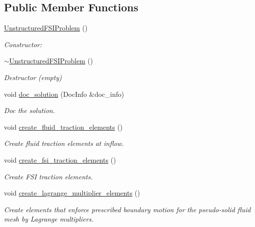 \subsection*{Public Member Functions}
\begin{DoxyCompactItemize}
\item 
\hyperlink{classUnstructuredFSIProblem_a6a31fd839e0215ef1312942cf7284bd2}{Unstructured\+F\+S\+I\+Problem} ()
\begin{DoxyCompactList}\small\item\em Constructor\+: \end{DoxyCompactList}\item 
\hyperlink{classUnstructuredFSIProblem_a976a81e0dee902f6713bd8ca4d79d000}{$\sim$\+Unstructured\+F\+S\+I\+Problem} ()
\begin{DoxyCompactList}\small\item\em Destructor (empty) \end{DoxyCompactList}\item 
void \hyperlink{classUnstructuredFSIProblem_a15f581318b505de07f50bd570da8c8d0}{doc\+\_\+solution} (Doc\+Info \&doc\+\_\+info)
\begin{DoxyCompactList}\small\item\em Doc the solution. \end{DoxyCompactList}\item 
void \hyperlink{classUnstructuredFSIProblem_af766e3bbc8963a286678cb1d277909f5}{create\+\_\+fluid\+\_\+traction\+\_\+elements} ()
\begin{DoxyCompactList}\small\item\em Create fluid traction elements at inflow. \end{DoxyCompactList}\item 
void \hyperlink{classUnstructuredFSIProblem_a934a587c99668fca969a72814b3142a7}{create\+\_\+fsi\+\_\+traction\+\_\+elements} ()
\begin{DoxyCompactList}\small\item\em Create F\+SI traction elements. \end{DoxyCompactList}\item 
void \hyperlink{classUnstructuredFSIProblem_a6f810c300f373cfc79e23d58f95944e3}{create\+\_\+lagrange\+\_\+multiplier\+\_\+elements} ()
\begin{DoxyCompactList}\small\item\em Create elements that enforce prescribed boundary motion for the pseudo-\/solid fluid mesh by Lagrange multipliers. \end{DoxyCompactList}\end{DoxyCompactItemize}
